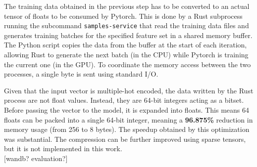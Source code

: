 The training data obtained in the previous step has to be converted to an actual tensor of floats to be consumed by Pytorch. This is done by a Rust subprocess running the subcommand \texttt{samples-service} that read the training data files and generates training batches for the specified feature set in a shared memory buffer. The Python script copies the data from the buffer at the start of each iteration, allowing Rust to generate the next batch (in the CPU) while Pytorch is training the current one (in the GPU). To coordinate the memory access between the two processes, a single byte is sent using standard I/O.

Given that the input vector is multiple-hot encoded, the data written by the Rust process are not float values. Instead, they are 64-bit integers acting as a bitset. Before passing the vector to the model, it is expanded into floats. This means 64 floats can be packed into a single 64-bit integer, meaning a \textbf{96.875\%} reduction in memory usage (from 256 to 8 bytes). The speedup obtained by this optimization was substantial. The compression can be further improved using sparse tensors, but it is not implemented in this work. \\

[wandb? evaluation?]


